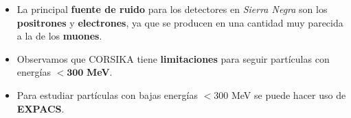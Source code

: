     \begin{frame}{} %
        \justifying %
        \vspace*{-1.5cm} %

        \begin{columns}
            \begin{column}{1.0\textwidth} %
                \begin{itemize}
                    \item La principal \textbf{fuente de ruido} para los detectores en \emph{Sierra Negra} son los \textbf{positrones} y \textbf{electrones}, ya que se producen en una cantidad muy parecida a la de los \textbf{muones}.
                    \item Observamos que CORSIKA tiene \textbf{limitaciones} para seguir partículas con energías $\bm{<} \mathbf{300}$ \textbf{MeV}.
                    \item Para estudiar partículas con bajas energías $<300$ MeV se puede hacer uso de \textbf{EXPACS}.
                \end{itemize}
            \end{column}
        \end{columns}         
    \end{frame}